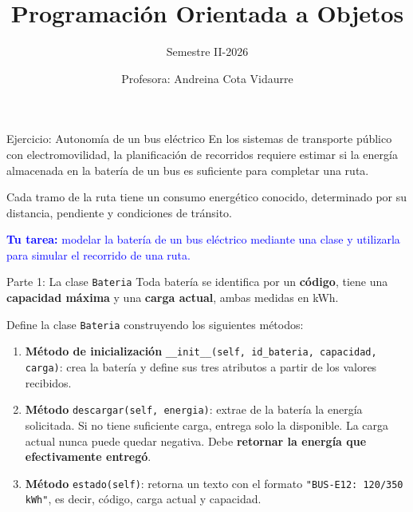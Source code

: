 \documentclass{beamer}
\title{Programación Orientada a Objetos}
\subtitle{Semestre II-2026}
\author{Profesora: Andreina Cota Vidaurre}
\begin{document}
  \shorthandoff{-}
  \frame[c]{\maketitle}

    \begin{frame}{Ejercicio: Autonomía de un bus eléctrico}
        En los sistemas de transporte público con electromovilidad, la planificación
        de recorridos requiere estimar si la energía almacenada en la batería de un
        bus es suficiente para completar una ruta.

        \vspace{0.4em}
        Cada tramo de la ruta tiene un consumo energético conocido, determinado por
        su distancia, pendiente y condiciones de tránsito.

        \vspace{0.6em}
        \textcolor{blue}{\textbf{Tu tarea:} modelar la batería de un bus eléctrico
        mediante una clase y utilizarla para simular el recorrido de una ruta.}
    \end{frame}

    \begin{frame}[fragile, t]{Parte 1: La clase \texttt{Bateria}}
        Toda batería se identifica por un \textbf{código}, tiene una
        \textbf{capacidad máxima} y una \textbf{carga actual}, ambas medidas en kWh.

        \vspace{0.4em}
        Define la clase \texttt{Bateria} construyendo los siguientes métodos:

        \begin{enumerate}
            \item \textbf{Método de inicialización}
            \texttt{__init__(self, id_bateria, capacidad, carga)}:
            crea la batería y define sus tres atributos a partir de los valores recibidos.
            \pause
            \item \textbf{Método} \texttt{descargar(self, energia)}:
            extrae de la batería la energía solicitada. Si no tiene suficiente carga,
            entrega solo la disponible. La carga actual nunca puede quedar negativa.
            Debe \textbf{retornar la energía que efectivamente entregó}.
            \pause
            \item \textbf{Método} \texttt{estado(self)}:
            retorna un texto con el formato \texttt{"BUS-E12: 120/350 kWh"},
            es decir, código, carga actual y capacidad.
        \end{enumerate}
    \end{frame}
\end{document}
